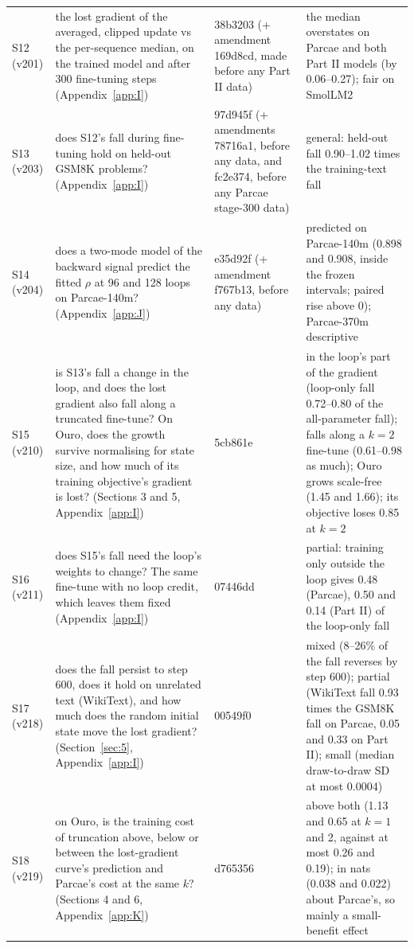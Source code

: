 \documentclass[10pt]{article}
\begin{document}
{\begin{xltabular}{\linewidth}{lXXX}
S12 (v201) & the lost gradient of the averaged, clipped update vs the per-sequence median, on the trained model and after 300 fine-tuning steps (Appendix~\ref{app:I}) & 38b3203 (+ amendment 169d8cd, made before any Part II data) & the median overstates on Parcae and both Part II models (by 0.06--0.27); fair on SmolLM2 \\
S13 (v203) & does S12's fall during fine-tuning hold on held-out GSM8K problems? (Appendix~\ref{app:I}) & 97d945f (+ amendments 78716a1, before any data, and fc2e374, before any Parcae stage-300 data) & general: held-out fall 0.90--1.02 times the training-text fall \\
S14 (v204) & does a two-mode model of the backward signal predict the fitted $\rho$ at 96 and 128 loops on Parcae-140m? (Appendix~\ref{app:J}) & e35d92f (+ amendment f767b13, before any data) & predicted on Parcae-140m (0.898 and 0.908, inside the frozen intervals; paired rise above 0); Parcae-370m descriptive \\
S15 (v210) & is S13's fall a change in the loop, and does the lost gradient also fall along a truncated fine-tune? On Ouro, does the growth survive normalising for state size, and how much of its training objective's gradient is lost? (Sections 3 and 5, Appendix~\ref{app:I}) & 5cb861e & in the loop's part of the gradient (loop-only fall 0.72--0.80 of the all-parameter fall); falls along a $k = 2$ fine-tune (0.61--0.98 as much); Ouro grows scale-free (1.45 and 1.66); its objective loses 0.85 at $k = 2$ \\
S16 (v211) & does S15's fall need the loop's weights to change? The same fine-tune with no loop credit, which leaves them fixed (Appendix~\ref{app:I}) & 07446dd & partial: training only outside the loop gives 0.48 (Parcae), 0.50 and 0.14 (Part II) of the loop-only fall \\
S17 (v218) & does the fall persist to step 600, does it hold on unrelated text (WikiText), and how much does the random initial state move the lost gradient? (Section~\ref{sec:5}, Appendix~\ref{app:I}) & 00549f0 & mixed (8--26\% of the fall reverses by step 600); partial (WikiText fall 0.93 times the GSM8K fall on Parcae, 0.05 and 0.33 on Part II); small (median draw-to-draw SD at most 0.0004) \\
S18 (v219) & on Ouro, is the training cost of truncation above, below or between the lost-gradient curve's prediction and Parcae's cost at the same $k$? (Sections 4 and 6, Appendix~\ref{app:K}) & d765356 & above both (1.13 and 0.65 at $k = 1$ and 2, against at most 0.26 and 0.19); in nats (0.038 and 0.022) about Parcae's, so mainly a small-benefit effect \\

\end{xltabular}}
\end{document}
